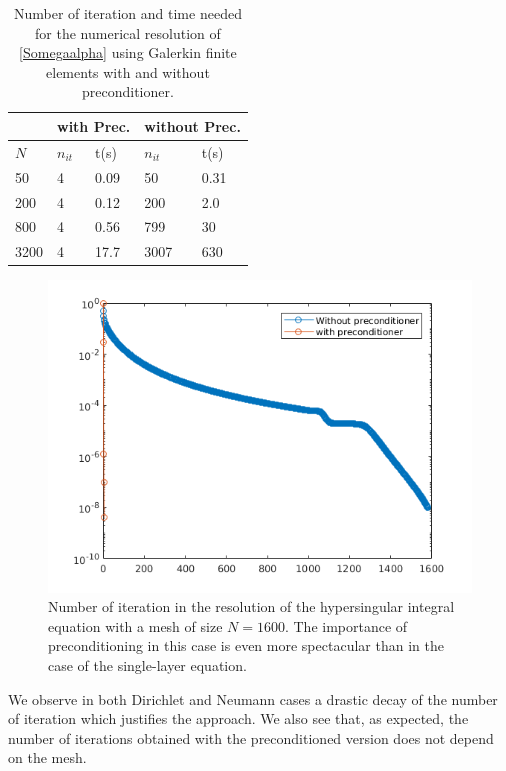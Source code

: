 \documentclass[a4paper]{subfiles}
\begin{document}
\begin{table}[H]
	\begin{center}
		\begin{tabular}{m{4em} | m{4em} | m{4em} | m{4em} | m{4em}} 
			\hline
			\multicolumn{1}{c|}{ }&
			\multicolumn{2}{c|}{with Prec.}&\multicolumn{2}{c}{without Prec.}\\
			\hline
			$N$ & $n_{it}$& t(s) & $n_{it}$ & t(s)\\
			\hline\hline
			50 & 4 & 0.09 & 50 & 0.31\\
			\hline
			200 & 4 & 0.12 & 200 & 2.0\\
			\hline
			800 & 4 & 0.56 & 799 & 30 \\
			\hline
			3200 & 4 & 17.7 & 3007 & 630\\
			\hline
		\end{tabular}
	\end{center}
	\caption{Number of iteration and time needed for the numerical resolution of \eqref{Somegaalpha} using Galerkin finite elements with and without preconditioner.}
	\label{TableNitTimeLaplaceNeumann}
\end{table}
\vspace{-0.7cm}
\begin{figure}[H]
	\centering
	\includegraphics[scale=0.5]{OpenArc/figs/PrecondNeumannLaplaceSeg.png}
	\caption{Number of iteration in the resolution of the hypersingular  integral equation with a mesh of size $N = 1600$. The importance of preconditioning 
	in this case is even more spectacular than in the case of the single-layer equation.}
	\label{FigureNitLaplaceNeumann}
\end{figure}
We observe in both Dirichlet and Neumann cases a drastic decay of the number of iteration which justifies the approach. We also see that, 
as expected, the number of iterations obtained with the preconditioned version does not depend on the mesh.
\end{document}
